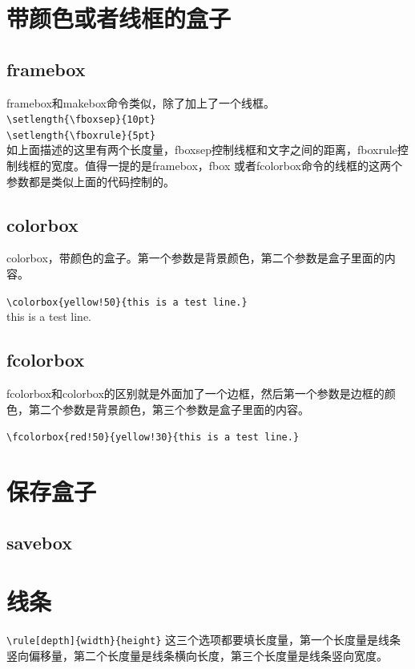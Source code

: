 \documentclass[12pt,oneside]{book}
\begin{document}
\begin{common-format}
\section{带颜色或者线框的盒子}
\subsection{framebox}
framebox和makebox命令类似，除了加上了一个线框。\\
\verb+\setlength{\fboxsep}{10pt}+\\
\verb+\setlength{\fboxrule}{5pt}+\\
如上面描述的这里有两个长度量，fboxsep控制线框和文字之间的距离，fboxrule控制线框的宽度。值得一提的是framebox，fbox 或者fcolorbox命令的线框的这两个参数都是类似上面的代码控制的。


\subsection{colorbox}
colorbox，带颜色的盒子。第一个参数是背景颜色，第二个参数是盒子里面的内容。

\verb+\colorbox{yellow!50}{this is a test line.}+\\
\colorbox{yellow!50}{this is a test line.}

\subsection{fcolorbox}
fcolorbox和colorbox的区别就是外面加了一个边框，然后第一个参数是边框的颜色，第二个参数是背景颜色，第三个参数是盒子里面的内容。

\verb+\fcolorbox{red!50}{yellow!30}{this is a test line.}+\\



\section{保存盒子}
\subsection{savebox}


\section{线条}
\verb+\rule[depth]{width}{height}+
这三个选项都要填长度量，第一个长度量是线条竖向偏移量，第二个长度量是线条横向长度，第三个长度量是线条竖向宽度。


\end{common-format}
\end{document}

